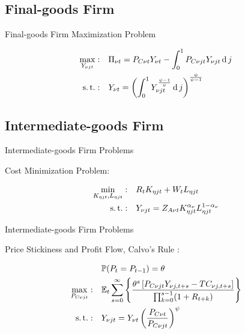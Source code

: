 \documentclass[../quali_slides.tex]{subfiles}
\begin{document}

\subsection{Final-goods Firm}

\begin{frame}{Final-goods Firm Maximization Problem}
	
\begin{align}
	\max_{Y_{\nu jt}}: &\quad \Pi_{\nu t} = P_{C\nu t} Y_{\nu t} - \int_{0}^{1} P_{C\nu jt} Y_{\nu jt} \operatorname{d} j \label{eq:reg-final-goods-firm-max-problem} \\
	\operatorname{s.t.}: & \quad Y_{\nu t} = \left( \int_{0}^{1} Y_{\nu jt}^{\frac{\psi-1}{\psi}} \operatorname{d} j \right)^{\frac{\psi}{\psi-1}} \label{eq:reg-final-goods-firm-bundle-rule}
\end{align}
		
\end{frame}


\subsection{Intermediate-goods Firm}

\begin{frame}{Intermediate-goods Firm Problems}
	
	Cost Minimization Problem:	
	
\begin{align}
	\label{eq:reg-int-good-firm-total-cost}
	\min_{K_{\eta jt}, L_{\eta jt}}: \quad & R_t K_{\eta jt} + W_t L_{\eta jt} \\
	\label{eq:reg-int-good-firm-production-function}
	\operatorname{s.t.}: \quad & Y_{\nu jt} = Z_{A\nu t} K_{\eta jt}^{\alpha_\nu} L_{\eta jt}^{1-{\alpha_\nu}}
\end{align}
	
\end{frame}


\begin{frame}{Intermediate-goods Firm Problems}
	
	Price Stickiness and Profit Flow, Calvo's Rule \cite{calvo_staggered_1983}:
	
\begin{align}
	& \quad \mathbb{P}(P_t=P_{t-1})=\theta \\
	\max_{P_{C\nu jt}}: & \quad {\mathbb{E}_{t}} \sum_{s=0}^{\infty} \left\{ \frac{ \theta^s \left[ P_{C\nu jt} Y_{\nu j,t+s} - TC_{\nu j,t+s} \right] }{\prod_{k=0}^{s-1}(1+R_{t+k})} \right\} \label{eq:reg-int-good-firm-optimal-price-problem} \\
	\operatorname{s.t.}: & \quad Y_{\nu jt} = Y_{\nu t} \left( \frac{P_{C\nu t}}{P_{C\nu jt}} \right)^{\psi}
\end{align}
	
\end{frame}
\end{document}
